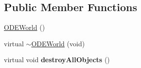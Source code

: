 \subsection*{Public Member Functions}
\begin{DoxyCompactItemize}
\item 
\hyperlink{classCartWheel_1_1Physics_1_1ODEWorld_ae66e4bf441a399e71321b31206b56c6d}{ODEWorld} ()
\item 
virtual \hyperlink{classCartWheel_1_1Physics_1_1ODEWorld_a613783ade6a491ef6544227e1b484594}{$\sim$ODEWorld} (void)
\item 
\hypertarget{classCartWheel_1_1Physics_1_1ODEWorld_a46d8205d2150d58f47c24b74b781a890}{
virtual void {\bfseries destroyAllObjects} ()}
\label{classCartWheel_1_1Physics_1_1ODEWorld_a46d8205d2150d58f47c24b74b781a890}


\end{DoxyCompactItemize}
